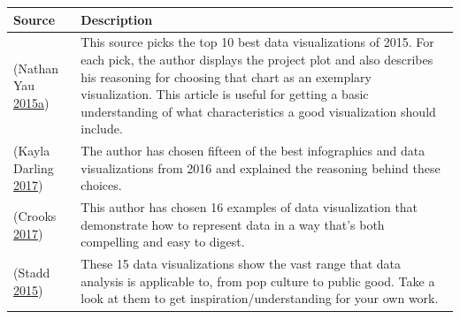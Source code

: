 \documentclass[]{book}
\begin{document}
\begin{longtable}[]{@{}ll@{}}
\toprule
\begin{minipage}[b]{0.14\columnwidth}\raggedright
\textbf{Source}\strut
\end{minipage} & \begin{minipage}[b]{0.80\columnwidth}\raggedright
\textbf{Description}\strut
\end{minipage}\tabularnewline
\midrule
\endhead
\begin{minipage}[t]{0.14\columnwidth}\raggedright
(Nathan Yau \protect\hyperlink{ref-10_best}{2015}\protect\hyperlink{ref-10_best}{a})\strut
\end{minipage} & \begin{minipage}[t]{0.80\columnwidth}\raggedright
This source picks the top 10 best data visualizations of 2015. For each pick, the author displays the project plot and also describes his reasoning for choosing that chart as an exemplary visualization. This article is useful for getting a basic understanding of what characteristics a good visualization should include.\strut
\end{minipage}\tabularnewline
\begin{minipage}[t]{0.14\columnwidth}\raggedright
(Kayla Darling \protect\hyperlink{ref-cool_data}{2017})\strut
\end{minipage} & \begin{minipage}[t]{0.80\columnwidth}\raggedright
The author has chosen fifteen of the best infographics and data visualizations from 2016 and explained the reasoning behind these choices.\strut
\end{minipage}\tabularnewline
\begin{minipage}[t]{0.14\columnwidth}\raggedright
(Crooks \protect\hyperlink{ref-int_viz_capt}{2017})\strut
\end{minipage} & \begin{minipage}[t]{0.80\columnwidth}\raggedright
This author has chosen 16 examples of data visualization that demonstrate how to represent data in a way that's both compelling and easy to digest.\strut
\end{minipage}\tabularnewline
\begin{minipage}[t]{0.14\columnwidth}\raggedright
(Stadd \protect\hyperlink{ref-15_mindblowing}{2015})\strut
\end{minipage} & \begin{minipage}[t]{0.80\columnwidth}\raggedright
These 15 data visualizations show the vast range that data analysis is applicable to, from pop culture to public good. Take a look at them to get inspiration/understanding for your own work.\strut

\end{minipage}
\end{longtable}
\end{document}
